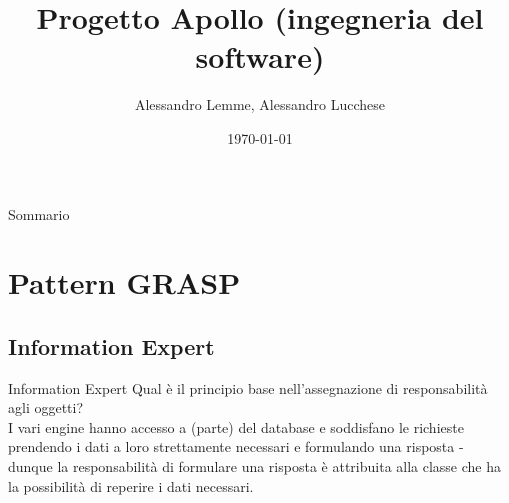 \documentclass{beamer}
\title{Progetto Apollo (ingegneria del software)}
\author{Alessandro Lemme, Alessandro Lucchese}
\institute{Università degli studi di Brescia}
\date{\today}
\begin{document}
\begin{frame}
\titlepage
\end{frame}

\begin{frame}{Sommario}
\tableofcontents
\end{frame}

\section{Pattern GRASP}

\subsection{Information Expert}
\begin{frame}{Information Expert}
Qual è il principio base nell’assegnazione di responsabilità agli oggetti? \\
\quad I vari engine hanno accesso a (parte) del database e soddisfano le richieste 
prendendo i dati a loro strettamente necessari e formulando una risposta - 
dunque la responsabilità di formulare una risposta è attribuita alla classe che
ha la possibilità di reperire i dati necessari.
\end{frame}


\end{document}
